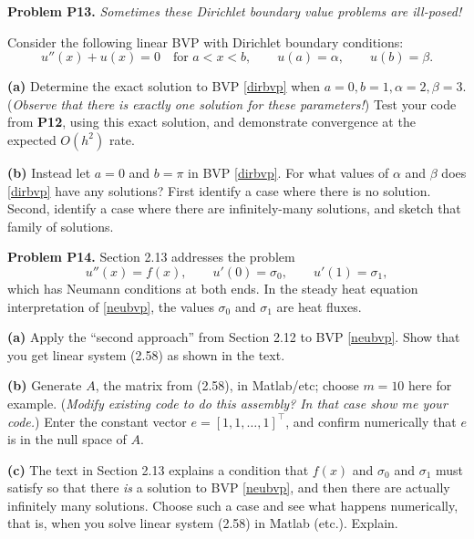 \documentclass[12pt]{amsart}
\newcommand{\prob}[1]{\bigskip\noindent\textbf{#1}\quad }
\newcommand{\epart}[1]{\medskip\noindent\textbf{(#1)}\quad }
\begin{document}
\prob{Problem P13.}  \emph{Sometimes these Dirichlet boundary value problems are ill-posed!}

\smallskip
\noindent Consider the following linear BVP with Dirichlet boundary conditions:
\begin{equation}
u''(x) +  u(x) = 0 \quad \text{for $a< x< b$}, \qquad u(a)=\alpha, \qquad u(b)=\beta.  \label{dirbvp}
\end{equation}

\epart{a} Determine the exact solution to BVP \eqref{dirbvp} when $a = 0, b = 1, \alpha = 2, \beta = 3$.  (\emph{Observe that there is exactly one solution for these parameters!})  Test your code from \textbf{P12}, using this exact solution, and demonstrate convergence at the expected $O(h^2)$ rate.  

\epart{b} Instead let $a=0$ and $b=\pi$ in BVP \eqref{dirbvp}.  For what values of $\alpha$ and $\beta$ does \eqref{dirbvp} have any solutions?  First identify a case where there is no solution.  Second, identify a case where there are infinitely-many solutions, and sketch that family of solutions.


\prob{Problem P14.}  Section 2.13 addresses the problem
\begin{equation}
u''(x) = f(x), \qquad u'(0)=\sigma_0, \qquad u'(1)=\sigma_1,  \label{neubvp}
\end{equation}
which has Neumann conditions at both ends.  In the steady heat equation interpretation of \eqref{neubvp}, the values $\sigma_0$ and $\sigma_1$ are heat fluxes.

\epart{a} Apply the ``second approach'' from Section 2.12 to BVP \eqref{neubvp}.  Show that you get linear system (2.58) as shown in the text.

\epart{b} Generate $A$, the matrix from (2.58), in Matlab/etc; choose $m=10$ here for example.  (\emph{Modify existing code to do this assembly?  In that case show me your code.})  Enter the constant vector $e=[1,1,\dots,1]^\top$, and confirm numerically that $e$ is in the null space of $A$.

\epart{c} The text in Section 2.13 explains a condition that $f(x)$ and $\sigma_0$ and $\sigma_1$ must satisfy so that there \emph{is} a solution to BVP \eqref{neubvp}, and then there are actually infinitely many solutions.  Choose such a case and see what happens numerically, that is, when you solve linear system (2.58) in Matlab (etc.).  Explain.
\end{document}
